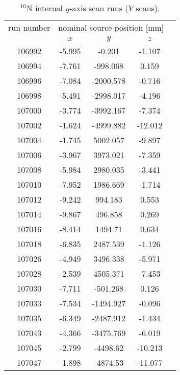 \begin{table}[ht]
		\caption[$^{16}$N internal $y$-axis scan runs.]{$^{16}$N internal $y$-axis scan runs ($Y$ scans).\label{table:n16scanTable_yscan}}
				\vspace{2mm}
				\centering
	\begin{tabular*}{90mm}{c@{\extracolsep{\fill}}*4c}
		\toprule 
		run number  & \multicolumn{3}{c}{nominal source position [mm]}  \\
		\cline{2-4}
		& $x$ & $y$ & $z$\\
		\midrule        
        106992 & -5.995 & -0.201 & -1.107\\
        106994 & -7.761 & -998.068 & 0.159\\
        106996 & -7.084 & -2000.578 & -0.716\\
        106998 & -5.491 & -2998.017 & -4.196\\
        107000 & -3.774 & -3992.167 & -7.374\\
        107002 & -1.624 & -4999.882 & -12.012\\
        107004 & -1.745 & 5002.057 & -9.897\\
        107006 & -3.967 & 3973.021 & -7.359\\
        107008 & -5.984 & 2980.035 & -3.441\\
        107010 & -7.952 & 1986.669 & -1.714\\
        107012 & -9.242 & 994.183 & 0.553\\
        107014 & -9.867 & 496.858 & 0.269\\
        107016 & -8.414 & 1494.71 & 0.634\\
        107018 & -6.835 & 2487.539 & -1.126\\
        107026 & -4.949 & 3496.338 & -5.971\\
        107028 & -2.539 & 4505.371 & -7.453\\
        107030 & -7.711 & -501.268 & 0.126\\
        107033 & -7.534 & -1494.927 & -0.096\\
        107035 & -6.349 & -2487.912 & -1.434\\
        107043 & -4.366 & -3475.769 & -6.019\\
        107045 & -2.799 & -4498.62 & -10.213\\
        107047 & -1.898 & -4874.53 & -11.077\\
        		\bottomrule	
       	\end{tabular*}
   \end{table} 

